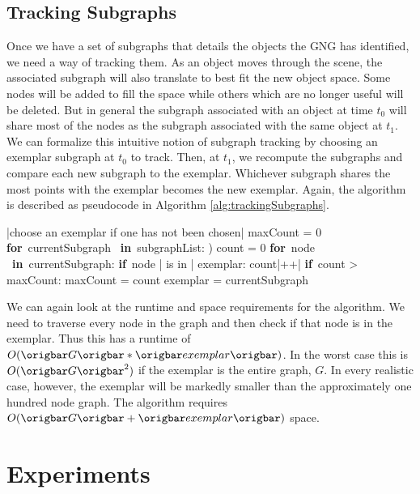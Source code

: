 \documentclass{article}
\renewcommand{\|}{\origbar} %
\renewcommand{\FOR}{\mbox{{\bf for} }\tab}
\renewcommand{\IF}{\mbox{{\bf if} }\tab}
\newcommand{\IN}{\mbox{ {\bf in} }}
\begin{document}
\subsection{Tracking Subgraphs}

Once we have a set of subgraphs that details the objects the GNG has identified, we need a way of tracking them. As an object moves through the scene, the associated subgraph will also translate to best fit the new object space. Some nodes will be added to fill the space while others which are no longer useful will be deleted. But in general the subgraph associated with an object at time $t_0$ will share most of the nodes as the subgraph associated with the same object at $t_1$. We can formalize this intuitive notion of subgraph tracking by choosing an exemplar subgraph at $t_0$ to track. Then, at $t_1$, we recompute the subgraphs and compare each new subgraph to the exemplar. Whichever subgraph shares the most points with the exemplar becomes the new exemplar. Again, the algorithm is described as pseudocode in Algorithm \ref{alg:trackingSubgraphs}.

\begin{Algorithm}[h!]
\begin{program}
  |choose an exemplar if one has not been chosen|
  maxCount = 0
  \FOR currentSubgraph \IN subgraphList: )
    count = 0
    \FOR node \IN currentSubgraph:
      \IF node | is in | exemplar:
        count|++| \untab \untab
    \IF count > maxCount:
      maxCount = count
      exemplar = currentSubgraph
\end{program}
\caption{Pseudocode for Tracking Subgraphs}
\label{alg:trackingSubgraphs}
\end{Algorithm}

We can again look at the runtime and space requirements for the algorithm. We need to traverse every node in the graph and then check if that node is in the exemplar. Thus this has a runtime of $O(\|G\|*\|exemplar\|)$. In the worst case this is $O(\|G\|^2)$ if the exemplar is the entire graph, $G$. In every realistic case, however, the exemplar will be markedly smaller than the approximately one hundred node graph. The algorithm requires $O(\|G\|+\|exemplar\|)$ space.

\section{Experiments}
\label{sec:experiments}
\end{document}
